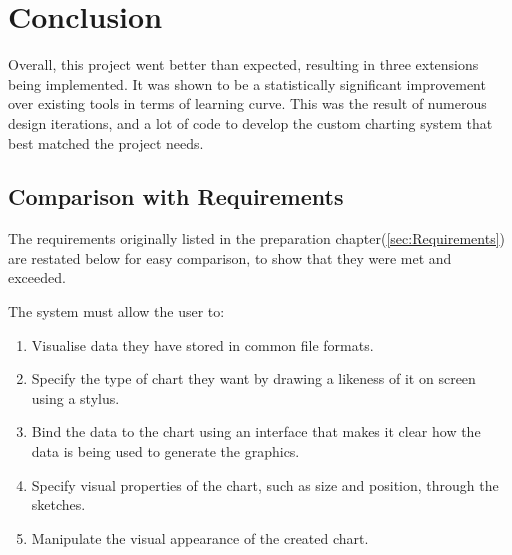\chapter{Conclusion}
Overall, this project went better than expected, resulting in three extensions being implemented. It was shown to be a statistically significant improvement over existing tools in terms of learning curve. This was the result of numerous design iterations, and a lot of code to develop the custom charting system that best matched the project needs.

\section{Comparison with Requirements}
The requirements originally listed in the preparation chapter(\autoref{sec:Requirements}) are restated below for easy comparison, to show that they were met and exceeded.

The system must allow the user to:
	\begin{enumerate}[label=\bfseries Core \arabic*]
		\item Visualise data they have stored in common file formats.
		\item Specify the type of chart they want by drawing a likeness of it on screen using a stylus.
		\item Bind the data to the chart using an interface that makes it clear how the data is being used to generate the graphics.
		\item Specify visual properties of the chart, such as size and position, through the sketches.
		\item Manipulate the visual appearance of the created chart.
	\end{enumerate}
	
